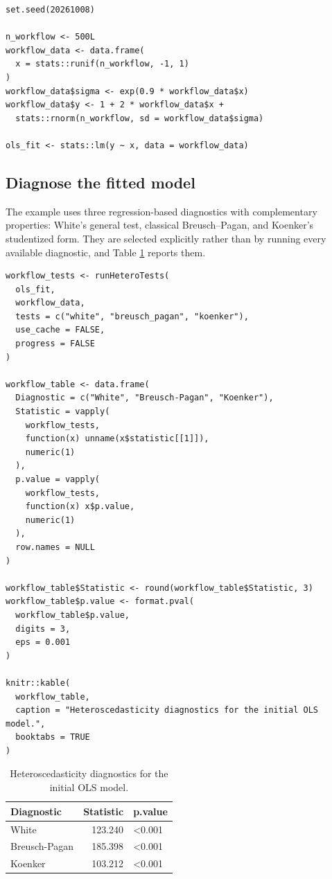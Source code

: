 \begin{verbatim}
set.seed(20261008)

n_workflow <- 500L
workflow_data <- data.frame(
  x = stats::runif(n_workflow, -1, 1)
)
workflow_data$sigma <- exp(0.9 * workflow_data$x)
workflow_data$y <- 1 + 2 * workflow_data$x +
  stats::rnorm(n_workflow, sd = workflow_data$sigma)

ols_fit <- stats::lm(y ~ x, data = workflow_data)
\end{verbatim}

\subsection{Diagnose the fitted model}\label{diagnose-the-fitted-model}

The example uses three regression-based diagnostics with complementary
properties: White's general test, classical Breusch--Pagan, and Koenker's
studentized form. They are selected explicitly rather than by running every
available diagnostic, and Table \ref{tab:workflow-diagnostics} reports them.

\begin{verbatim}
workflow_tests <- runHeteroTests(
  ols_fit,
  workflow_data,
  tests = c("white", "breusch_pagan", "koenker"),
  use_cache = FALSE,
  progress = FALSE
)

workflow_table <- data.frame(
  Diagnostic = c("White", "Breusch-Pagan", "Koenker"),
  Statistic = vapply(
    workflow_tests,
    function(x) unname(x$statistic[[1]]),
    numeric(1)
  ),
  p.value = vapply(
    workflow_tests,
    function(x) x$p.value,
    numeric(1)
  ),
  row.names = NULL
)

workflow_table$Statistic <- round(workflow_table$Statistic, 3)
workflow_table$p.value <- format.pval(
  workflow_table$p.value,
  digits = 3,
  eps = 0.001
)

knitr::kable(
  workflow_table,
  caption = "Heteroscedasticity diagnostics for the initial OLS model.",
  booktabs = TRUE
)
\end{verbatim}

\begin{table}

\caption{\label{tab:workflow-diagnostics}Heteroscedasticity diagnostics for the initial OLS model.}
\centering
\begin{tabular}[t]{lrl}
\toprule
Diagnostic & Statistic & p.value\\
\midrule
White & 123.240 & <0.001\\
Breusch-Pagan & 185.398 & <0.001\\
Koenker & 103.212 & <0.001\\
\bottomrule
\end{tabular}
\end{table}


